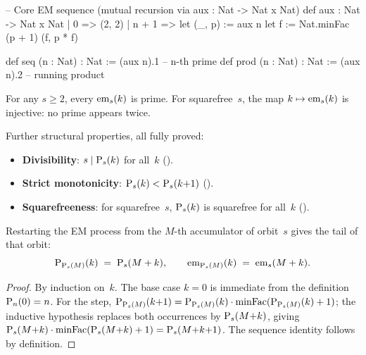 \begin{leancode}
-- Core EM sequence (mutual recursion via aux : Nat -> Nat x Nat)
def aux : Nat -> Nat x Nat
  | 0     => (2, 2)
  | n + 1 => let (_, p) := aux n
             let f := Nat.minFac (p + 1)
             (f, p * f)

def seq  (n : Nat) : Nat := (aux n).1   -- n-th prime
def prod (n : Nat) : Nat := (aux n).2   -- running product
\end{leancode}

\begin{theorem}\label{thm:seq-props}
For any $s \geq 2$, every $\mathrm{em}_{s}(k)$ is prime.
For squarefree~$s$, the map $k \mapsto \mathrm{em}_{s}(k)$ is injective:
no prime appears twice.
\end{theorem}

\noindent Further structural properties, all fully proved:
\begin{itemize}[nosep]
\item \textbf{Divisibility}: $s \mid \mathrm{P}_{s}(k)$ for all~$k$
  ().
\item \textbf{Strict monotonicity}: $\mathrm{P}_{s}(k) < \mathrm{P}_{s}(k{+}1)$
  ().
\item \textbf{Squarefreeness}: for squarefree~$s$, $\mathrm{P}_{s}(k)$ is
  squarefree for all~$k$
  ().
\end{itemize}

\begin{theorem}\label{thm:tail-id}
Restarting the EM process from the $M$-th accumulator of orbit~$s$
gives the tail of that orbit:
\[
  \mathrm{P}_{\mathrm{P}_{s}(M)}(k) \;=\; \mathrm{P}_{s}(M + k),
  \qquad
  \mathrm{em}_{\mathrm{P}_{s}(M)}(k) \;=\; \mathrm{em}_{s}(M + k).
\]
\end{theorem}

\begin{proof}
By induction on~$k$.  The base case $k = 0$ is immediate from the
definition $\mathrm{P}_{n}(0) = n$.  For the step,
$\mathrm{P}_{\mathrm{P}_{s}(M)}(k{+}1) = \mathrm{P}_{\mathrm{P}_{s}(M)}(k) \cdot
\mathrm{minFac}(\mathrm{P}_{\mathrm{P}_{s}(M)}(k) + 1)$; the inductive hypothesis
replaces both occurrences by $\mathrm{P}_{s}(M{+}k)$, giving
$\mathrm{P}_{s}(M{+}k) \cdot \mathrm{minFac}(\mathrm{P}_{s}(M{+}k) + 1) =
\mathrm{P}_{s}(M{+}k{+}1)$.  The sequence identity follows by
definition.
\end{proof}

